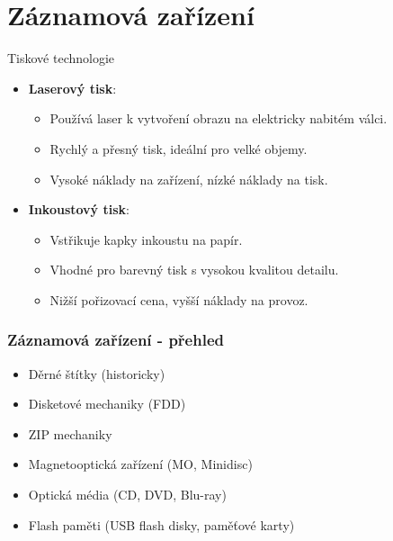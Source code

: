 \documentclass[aspectratio=43]{beamer}
\begin{document}
\section{Záznamová zařízení}
\begin{frame}{Tiskové technologie}
    \begin{itemize}
        \item \textbf{Laserový tisk}:
        \begin{itemize}
            \item Používá laser k vytvoření obrazu na elektricky nabitém válci.
            \item Rychlý a přesný tisk, ideální pro velké objemy.
            \item Vysoké náklady na zařízení, nízké náklady na tisk.
        \end{itemize}
        \item \textbf{Inkoustový tisk}:
        \begin{itemize}
            \item Vstřikuje kapky inkoustu na papír.
            \item Vhodné pro barevný tisk s vysokou kvalitou detailu.
            \item Nižší pořizovací cena, vyšší náklady na provoz.
        \end{itemize}
    \end{itemize}
\end{frame}

\begin{frame}
\frametitle{Záznamová zařízení - přehled}
\begin{itemize}
\item Děrné štítky (historicky)
\item Disketové mechaniky (FDD)
\item ZIP mechaniky
\item Magnetooptická zařízení (MO, Minidisc)
\item Optická média (CD, DVD, Blu-ray)
\item Flash paměti (USB flash disky, paměťové karty)
\end{itemize}
\end{frame}
\end{document}
